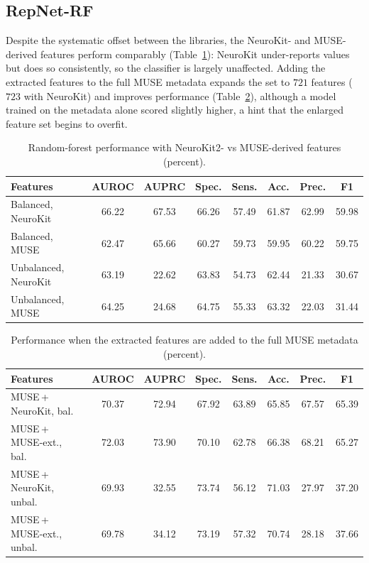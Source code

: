 \documentclass[sigconf,nonacm]{acmart}
\begin{document}
\subsection{RepNet-RF}
\label{sec:results-rf}

Despite the systematic offset between the libraries, the NeuroKit- and
MUSE-derived features perform comparably (Table~\ref{tab:rf-perf1}): NeuroKit
under-reports values but does so consistently, so the classifier is largely
unaffected. Adding the extracted features to the full MUSE metadata expands
the set to $721$ features ($723$ with NeuroKit) and improves performance
(Table~\ref{tab:rf-perf2}), although a model trained on the metadata alone
scored slightly higher, a hint that the enlarged feature set begins to
overfit.

\begin{table}[H]
\centering
\caption{Random-forest performance with NeuroKit2- vs MUSE-derived features
(percent).}
\label{tab:rf-perf1}
\footnotesize
\setlength{\tabcolsep}{2.7pt}
\begin{tabular}{@{}lccccccc@{}}
\toprule
\textbf{Features} & AUROC & AUPRC & Spec. & Sens. & Acc. & Prec. & F1 \\
\midrule
Balanced, NeuroKit   & 66.22 & 67.53 & 66.26 & 57.49 & 61.87 & 62.99 & 59.98 \\
Balanced, MUSE       & 62.47 & 65.66 & 60.27 & 59.73 & 59.95 & 60.22 & 59.75 \\
Unbalanced, NeuroKit & 63.19 & 22.62 & 63.83 & 54.73 & 62.44 & 21.33 & 30.67 \\
Unbalanced, MUSE     & 64.25 & 24.68 & 64.75 & 55.33 & 63.32 & 22.03 & 31.44 \\
\bottomrule
\end{tabular}
\end{table}

\begin{table}[H]
\centering
\caption{Performance when the extracted features are added to the full MUSE
metadata (percent).}
\label{tab:rf-perf2}
\footnotesize
\setlength{\tabcolsep}{2.7pt}
\begin{tabular}{@{}lccccccc@{}}
\toprule
\textbf{Features} & AUROC & AUPRC & Spec. & Sens. & Acc. & Prec. & F1 \\
\midrule
MUSE\,+\,NeuroKit, bal.\    & 70.37 & 72.94 & 67.92 & 63.89 & 65.85 & 67.57 & 65.39 \\
MUSE\,+\,MUSE-ext., bal.\   & 72.03 & 73.90 & 70.10 & 62.78 & 66.38 & 68.21 & 65.27 \\
MUSE\,+\,NeuroKit, unbal.\  & 69.93 & 32.55 & 73.74 & 56.12 & 71.03 & 27.97 & 37.20 \\
MUSE\,+\,MUSE-ext., unbal.\ & 69.78 & 34.12 & 73.19 & 57.32 & 70.74 & 28.18 & 37.66 \\
\bottomrule
\end{tabular}
\end{table}
\end{document}
